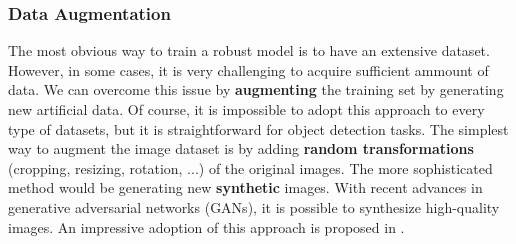 \subsubsection{Data Augmentation}
The most obvious way to train a robust model is to have an extensive dataset.
However, in some cases, it is very challenging to acquire sufficient ammount of
data. We can overcome this issue by
\textbf{augmenting} the training set by generating new artificial data. Of
course, it is impossible to adopt this approach to every type of datasets, but
it is straightforward for object detection tasks. The simplest way to augment
the image dataset is by adding \textbf{random transformations} (cropping,
resizing, rotation, ...) of the original images. The more sophisticated method
would be generating new \textbf{synthetic} images. With recent advances in
generative adversarial networks (GANs), it is possible to synthesize
high-quality images. An impressive adoption of this approach is proposed in
\cite{wei2019generative}.